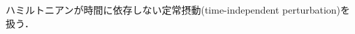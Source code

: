 \documentclass{report}
\begin{document}
  ハミルトニアンが時間に依存しない定常摂動(time-independent perturbation)を扱う．
\end{document}
